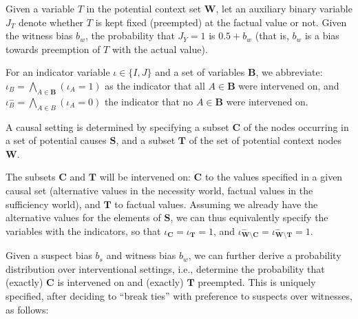 \documentclass[anon,12pt]{clear2025} %
\begin{document}
\begin{definition}
    Given a variable \(T\) in the potential context set \(\mathbf{W}\), let an auxiliary binary variable \(J_T\) denote whether \(T\) is kept fixed (preempted) at the factual value or not. Given the witness  bias \(b_w\), the probability that \(J_Y=1\)  is \(0.5 + b_w\) (that is, $b_w$ is a bias towards preemption of $T$ with the actual value).
\end{definition}

\noindent For an indicator variable $\iota\in \{I, J\}$ and a set of variables \(\mathbf{B}\), we abbreviate: \(\iota_B = \bigwedge_{A \in \mathbf{B}} \left(\iota _A = 1 \right)\) as the indicator that all $A \in \mathbf{B}$ were intervened on,   and \(\iota_B^- = \bigwedge_{A\in B} \left(\iota_A = 0\right)\) the indicator that no $A \in \mathbf{B}$ were intervened on.

\begin{definition} \label{def:interventional_setting} A causal setting is determined by specifying a subset $\mathbf{C}$ of the nodes occurring in a set of potential causes $\mathbf{S}$, and
    a subset $\mathbf{T}$ of the set of potential context nodes $\mathbf{W}$.
\end{definition}


The subsets $\mathbf{C}$ and $\mathbf{T}$ will be intervened on: $\mathbf{C}$ to the values specified in a given causal set (alternative values in the necessity world, factual values in the sufficiency world), and $\mathbf{T}$ to factual values. Assuming we already have the alternative values for the elements of $\mathbf{S}$, we can thus equivalently specify the variables with the indicators, so that $\iota_{\mathbf{C}} = \iota_{\mathbf{T}} = 1$, and $\iota^{-}_{\mathbf{W} \setminus \mathbf{C}} = \iota^{-}_{\mathbf{W} \setminus \mathbf{T}} = 1$.

Given a suspect bias $b_s$ and witness bias $b_w$, we can further derive a probability distribution over interventional settings, i.e., determine the probability that (exactly) $\mathbf{C}$ is intervened on and (exactly) $\mathbf{T}$ preempted. This is uniquely specified, after deciding to ``break ties'' with preference to suspects over witnesses, as follows:
\end{document}
